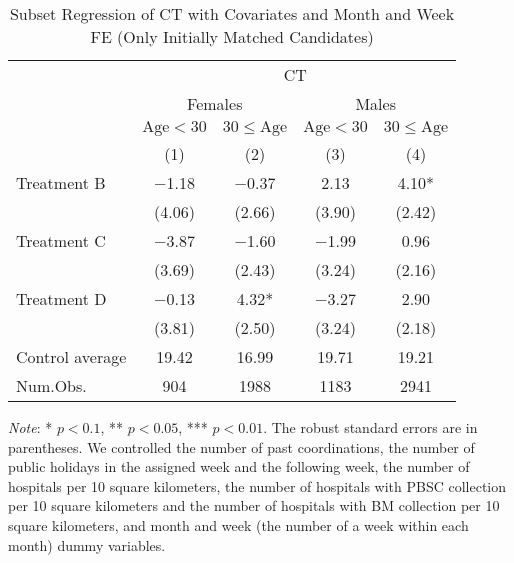 \documentclass[12pt, a4paper]{article}
\begin{document}
\begin{table}[H]

\caption{\label{tab:lm-test-subset2-init}Subset Regression of CT with Covariates and Month and Week FE (Only Initially Matched Candidates)}
\centering
\fontsize{8}{10}\selectfont
\begin{threeparttable}
\begin{tabular}[t]{lcccc}
\toprule
\multicolumn{1}{c}{ } & \multicolumn{4}{c}{CT} \\
\cmidrule(l{3pt}r{3pt}){2-5}
\multicolumn{1}{c}{ } & \multicolumn{2}{c}{Females} & \multicolumn{2}{c}{Males} \\
\cmidrule(l{3pt}r{3pt}){2-3} \cmidrule(l{3pt}r{3pt}){4-5}
\multicolumn{1}{c}{ } & \multicolumn{1}{c}{$\text{Age} < 30$} & \multicolumn{1}{c}{$30 \le \text{Age}$} & \multicolumn{1}{c}{$\text{Age} < 30$} & \multicolumn{1}{c}{$30 \le \text{Age}$} \\
\cmidrule(l{3pt}r{3pt}){2-2} \cmidrule(l{3pt}r{3pt}){3-3} \cmidrule(l{3pt}r{3pt}){4-4} \cmidrule(l{3pt}r{3pt}){5-5}
  & (1) & (2) & (3) & (4)\\
\midrule
Treatment B & \num{-1.18} & \num{-0.37} & \num{2.13} & \num{4.10}*\\
 & (\num{4.06}) & (\num{2.66}) & (\num{3.90}) & (\num{2.42})\\
Treatment C & \num{-3.87} & \num{-1.60} & \num{-1.99} & \num{0.96}\\
 & (\num{3.69}) & (\num{2.43}) & (\num{3.24}) & (\num{2.16})\\
Treatment D & \num{-0.13} & \num{4.32}* & \num{-3.27} & \num{2.90}\\
 & (\num{3.81}) & (\num{2.50}) & (\num{3.24}) & (\num{2.18})\\
\midrule
Control average & 19.42 & 16.99 & 19.71 & 19.21\\
Num.Obs. & \num{904} & \num{1988} & \num{1183} & \num{2941}\\
\bottomrule
\end{tabular}
\begin{tablenotes}
\item \emph{Note}: * $p < 0.1$, ** $p < 0.05$, *** $p < 0.01$. The robust standard errors are in parentheses. We controlled the number of past coordinations, the number of public holidays in the assigned week and the following week, the number of hospitals per 10 square kilometers, the number of hospitals with PBSC collection per 10 square kilometers and the number of hospitals with BM collection per 10 square kilometers, and month and week (the number of a week within each month) dummy variables.
\end{tablenotes}
\end{threeparttable}
\end{table}
\end{document}
